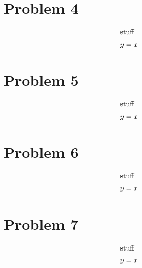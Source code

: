 \documentclass[12pt]{article}
\begin{document}
 
\newpage
\section*{Problem 4}

\begin{align} 
    \intertext{stuff}
    y&=x
\end{align}



\newpage
\section*{Problem 5}

\begin{align} 
    \intertext{stuff}
    y&=x
\end{align}


\section*{Problem 6}

\begin{align} 
    \intertext{stuff}
    y&=x
\end{align}



\section*{Problem 7}

\begin{align} 
    \intertext{stuff}
    y&=x
\end{align}


\end{document}
